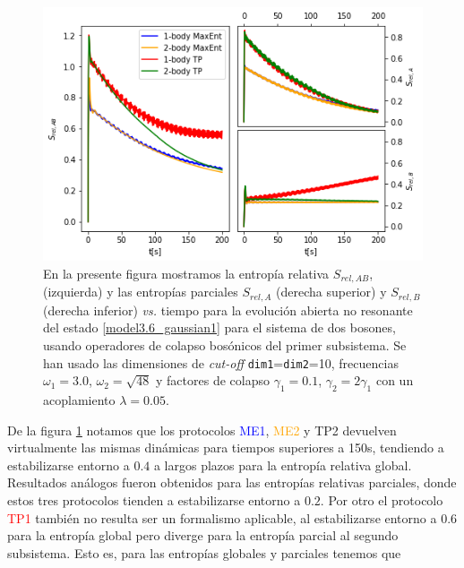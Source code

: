 \documentclass{report} %
\numberwithin{equation}{section}
\begin{document}
\begin{figure}
    \centering
    \includegraphics[scale=0.6]{figs/section3_4/section5_bxb-open-nonres/rel_entropy_open_nonres_ng.png}
    \caption{En la presente figura mostramos la entropía relativa $S_{rel,AB}$, (izquierda) y las entropías parciales $S_{rel,A}$ (derecha superior) y $S_{rel,B}$ (derecha inferior) \textit{vs.} tiempo para la evolución abierta no resonante del estado \eqref{model3.6_gaussian1} para el sistema de dos bosones, usando operadores de colapso bosónicos del primer subsistema. Se han usado las dimensiones de \textit{cut-off} \texttt{dim1}=\texttt{dim2}=10, frecuencias $\omega_1 = 3.0$, $\omega_2 = \sqrt{48}$ y factores de colapso $\gamma_1 = 0.1$, $\gamma_2 = 2 \gamma_1$ con un acoplamiento $\lambda = 0.05$.}
    \label{rel_entropy_open_nonres}
\end{figure}

De la figura \ref{rel_entropy_open_nonres} notamos que los protocolos \textcolor{blue}{ME1}, \textcolor{orange}{ME2} y \textcolor{dark green}{TP2}  devuelven virtualmente las mismas dinámicas para tiempos superiores a 150s, tendiendo a estabilizarse entorno a $0.4$ a largos plazos para la entropía relativa global. Resultados análogos fueron obtenidos para las entropías relativas parciales, donde estos tres protocolos tienden a estabilizarse entorno a $0.2$.
Por otro el protocolo \textcolor{red}{TP1} también no resulta ser un formalismo aplicable, al estabilizarse entorno a $0.6$ para la entropía global pero diverge para la entropía parcial al segundo subsistema. Esto es, para las entropías globales y parciales tenemos que 
\end{document}
